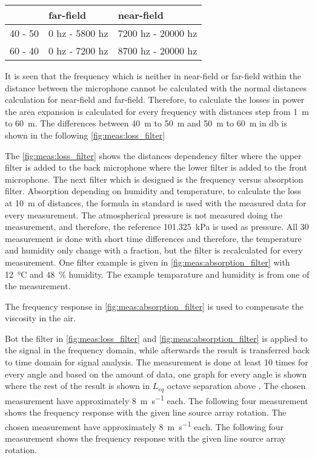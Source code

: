 \begin{table}[H]
\begin{tabular}{l|ll}
        & far-field      & near-field         \\ \hline
40 - 50 & 0 hz - 5800 hz & 7200 hz - 20000 hz \\
60 - 40 & 0 hz - 7200 hz & 8700 hz - 20000 hz
\end{tabular}
\label{meas:tab_dis_vs_field}
\end{table}

It is seen that the frequency which is neither in near-field or far-field within the distance between the microphone cannot be calculated with the normal distances calculation for near-field and far-field. Therefore, to calculate the losses in power the area expansion is calculated for every frequency with distances step from \SI{1}{\meter} to \SI{60}{\meter}. The differences between \SI{40}{\meter} to \SI{50}{\meter} and \SI{50}{\meter} to \SI{60}{\meter} in \si{db} is shown in the following \autoref{fig:meas:loss_filter}


The \autoref{fig:meas:loss_filter} shows the distances dependency filter where the upper filter is added to the back microphone where the lower filter is added to the front microphone. The next filter which is designed is the frequency versus absorption filter. 
Absorption depending on humidity and temperature, to calculate the loss at \SI{10}{\meter} of distances, the formula in standard \citep{iso_9613-1} is used with the measured data for every measurement. The atmospherical pressure is not measured doing the measurement, and therefore, the reference \SI{101.325}{\kilo\pascal} is used as pressure. All 30 measurement is done with short time differences and therefore, the temperature and humidity only change with a fraction, but the filter is recalculated for every measurement. One filter example is given in \autoref{fig:meas:absorption_filter} with \SI{12}{\celsius} and \SI{48}{\percent} humidity. The example temparature and humidity is from one of the measurement.

  
 
The frequency response in \autoref{fig:meas:absorption_filter} is used to compensate the viscosity in the air. 

Bot the filter in \autoref{fig:meas:loss_filter} and \autoref{fig:meas:absorption_filter} is applied to the signal in the frequency domain, while afterwards the result is transferred back to time domain for signal analysis.  The measurement is done at least 10 times for every angle and based on the amount of data, one graph for every angle is shown where the rest of the result is shown in $L_{eq}$ octave separation above . The chosen measurement have approximately \SI{8}{\meter\per\second} each. The following four measurement shows the frequency response with the given line source array rotation. The chosen measurement have approximately \SI{8}{\meter\per\second} each. The following four measurement shows the frequency response with the given line source array rotation.
   
